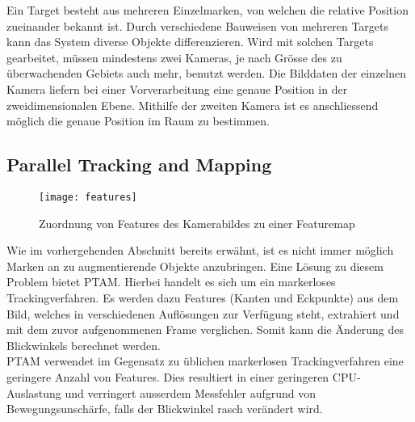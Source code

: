 Ein Target besteht aus mehreren Einzelmarken, von welchen die relative Position zueinander bekannt ist. Durch verschiedene Bauweisen von mehreren Targets kann das System diverse Objekte differenzieren. Wird mit solchen Targets gearbeitet, müssen mindestens zwei Kameras, je nach Grösse des zu überwachenden Gebiets auch mehr, benutzt werden. Die Bilddaten der einzelnen Kamera liefern bei einer Vorverarbeitung eine genaue Position in der zweidimensionalen Ebene. Mithilfe der zweiten Kamera ist es anschliessend möglich die genaue Position im Raum zu bestimmen.\cite[S.~106~ff.]{doerner13}
\newpage
\subsection*{Parallel Tracking and Mapping}
\begin{wrapfigure}{r}{0.35\textwidth}
	\vspace{-30pt}
	\begin{center}
		\texttt{[image: features]}
	\end{center}
	\vspace{-15pt}
	\captionsetup{width=0.28\textwidth}
	\caption{Zuordnung von Features des Kamerabildes zu einer Featuremap}\label{features}
	\vspace{-20pt}
\end{wrapfigure}
Wie im vorhergehenden Abschnitt bereits erwähnt, ist es nicht immer möglich Marken an zu augmentierende Objekte anzubringen. Eine Lösung zu diesem Problem bietet PTAM. Hierbei handelt es sich um ein markerloses Trackingverfahren. Es werden dazu Features (Kanten und Eckpunkte) aus dem Bild, welches in verschiedenen Auflösungen zur Verfügung steht, extrahiert und mit dem zuvor aufgenommenen Frame verglichen. Somit kann die Änderung des Blickwinkels berechnet werden.\cite[S.~106~ff.]{doerner13}\\[6pt]
PTAM verwendet im Gegensatz zu üblichen markerlosen Trackingverfahren eine geringere Anzahl von Features. Dies resultiert in einer geringeren CPU-Auslastung und verringert ausserdem Messfehler aufgrund von Bewegungsunschärfe, falls der Blickwinkel rasch verändert wird.\cite{website:ptam}

